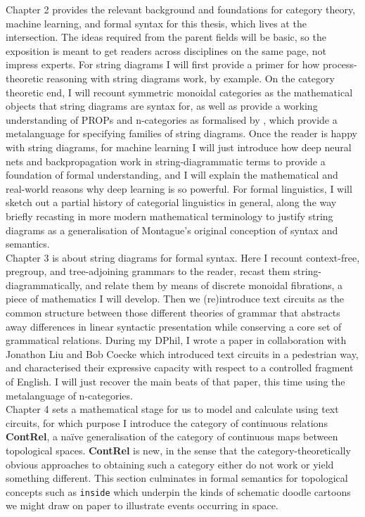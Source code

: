 {Chapter 2 provides the relevant background and foundations for category theory, machine learning, and formal syntax for this thesis, which lives at the intersection. The ideas required from the parent fields will be basic, so the exposition is meant to get readers across disciplines on the same page, not impress experts. For string diagrams I will first provide a primer for how process-theoretic reasoning with string diagrams work, by example. On the category theoretic end, I will recount symmetric monoidal categories as the mathematical objects that string diagrams are syntax for, as well as provide a working understanding of PROPs \citep{} and n-categories as formalised by \citep{}, which provide a metalanguage for specifying families of string diagrams. Once the reader is happy with string diagrams, for machine learning I will just introduce how deep neural nets and backpropagation work in string-diagrammatic terms to provide a foundation of formal understanding, and I will explain the mathematical and real-world reasons why deep learning is so powerful. For formal linguistics, I will sketch out a partial history of categorial linguistics in general, along the way briefly recasting \citep{} in more modern mathematical terminology to justify string diagrams as a generalisation of Montague's original conception of syntax and semantics.\\

Chapter 3 is about string diagrams for formal syntax. Here I recount context-free, pregroup, and tree-adjoining grammars to the reader, recast them string-diagrammatically, and relate them by means of discrete monoidal fibrations, a piece of mathematics I will develop. Then we (re)introduce text circuits as the common structure between those different theories of grammar that abstracts away differences in linear syntactic presentation while conserving a core set of grammatical relations. During my DPhil, I wrote a paper \citep{} in collaboration with Jonathon Liu and Bob Coecke which introduced text circuits in a pedestrian way, and characterised their expressive capacity with respect to a controlled fragment of English. I will just recover the main beats of that paper, this time using the metalanguage of n-categories.\\

Chapter 4 sets a mathematical stage for us to model and calculate using text circuits, for which purpose I introduce the category of continuous relations \textbf{ContRel}, a na\"{i}ve generalisation of the category of continuous maps between topological spaces. \textbf{ContRel} is new, in the sense that the category-theoretically obvious approaches to obtaining such a category either do not work or yield something different. This section culminates in formal semantics for topological concepts such as \texttt{inside} which underpin the kinds of schematic doodle cartoons we might draw on paper to illustrate events occurring in space.\\

}
